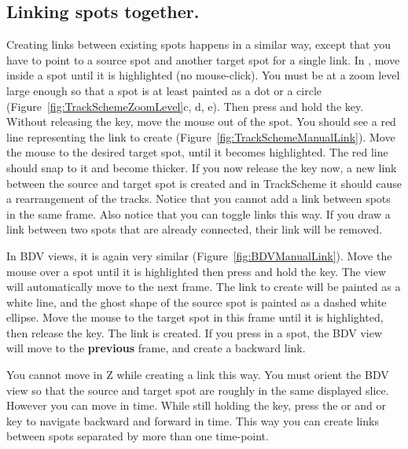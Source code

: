 \subsection{Linking spots together.}

Creating links between existing spots happens in a similar way, except that you have to point to a source spot and another target spot for a single link.
In \TrackScheme, move inside a spot until it is highlighted (no mouse-click).
You must be at a zoom level large enough so that a spot is at least painted as a dot or a circle (Figure~\ref{fig:TrackSchemeZoomLevel}c, d, e). 
Then press and hold the  key.
Without releasing the  key, move the mouse out of the spot.
You should see a red line representing the link to create (Figure~\ref{fig:TrackSchemeManualLink}).
Move the mouse to the desired target spot, until it becomes highlighted.
The red line should snap to it and become thicker.
If you now release the  key now, a new link between the source and target spot is created and in TrackScheme it should cause a rearrangement of the tracks.
Notice that you cannot add a link between spots in the same frame.
Also notice that you can toggle links this way.
If you draw a link between two spots that are already connected, their link will be removed.

In BDV views, it is again very similar (Figure~\ref{fig:BDVManualLink}).
Move the mouse over a spot until it is highlighted then press and hold the  key.
The view will automatically move to the next frame. 
The link to create will be painted as a white line, and the ghost shape of the source spot is painted as a dashed white ellipse. 
Move the mouse to the target spot in this frame until it is highlighted, then release the  key.
The link is created.
If you press  in a spot, the BDV view will move to the \textbf{previous} frame, and create a backward link.

You cannot move in Z while creating a link this way. 
You must orient the BDV view so that the source and target spot are roughly in the same displayed slice. 
However you can move in time. 
While still holding the  key, press the  or \keys{[} and  or \keys{]} key to navigate backward and forward in time.
This way you can create links between spots separated by more than one time-point.



